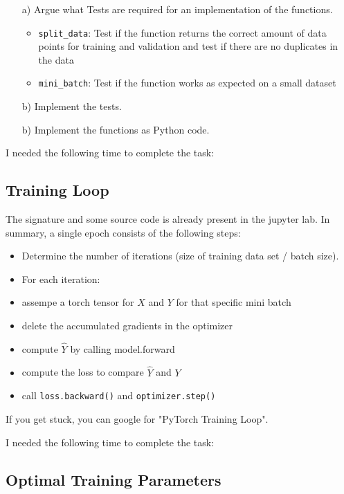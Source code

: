 \documentclass{article}
\begin{document}
\begin{enumerate}

\item[a)] Argue what Tests are required for an implementation of the functions.
\begin{itemize}
    \item \texttt{split\_data}: Test if the function returns the correct amount of data points for training and validation and test if there are no duplicates in the data
    \item \texttt{mini\_batch}: Test if the function works as expected on a small dataset
\end{itemize} 

\item[b)] Implement the tests.

\item[b)] Implement the functions as Python code.

\end{enumerate}

I needed the following time to complete the task:

\subsection{Training Loop}

The signature and some source code is already present in the jupyter lab. In summary, a single epoch consists of the following steps:

\begin{itemize}
\item Determine the number of iterations (size of training data set / batch size).
\item For each iteration:
\item assempe a torch tensor for $X$ and $Y$ for that specific mini batch
\item delete the accumulated gradients in the optimizer
\item compute $\hat{Y}$ by calling model.forward
\item compute the loss to compare $\hat{Y}$ and $Y$
\item call \texttt{loss.backward()} and \texttt{optimizer.step()}
\end{itemize}

If you get stuck, you can google for "PyTorch Training Loop". 

I needed the following time to complete the task:

\subsection{Optimal Training Parameters}
\end{document}
